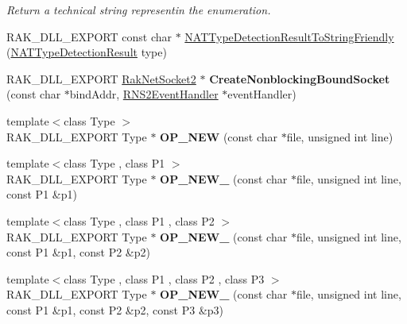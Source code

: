 \begin{DoxyCompactItemize}
\begin{DoxyCompactList}\small\item\em Return a technical string representin the enumeration. \end{DoxyCompactList}\item 
R\-A\-K\-\_\-\-D\-L\-L\-\_\-\-E\-X\-P\-O\-R\-T const char $\ast$ \hyperlink{namespace_rak_net_aa400a447c631b730d879855b65fe2f67}{N\-A\-T\-Type\-Detection\-Result\-To\-String\-Friendly} (\hyperlink{namespace_rak_net_a81848fd95488939c0b3e217209f31139}{N\-A\-T\-Type\-Detection\-Result} type)
\item 
\hypertarget{namespace_rak_net_a726ce73c276121235404b595fb1065c6}{R\-A\-K\-\_\-\-D\-L\-L\-\_\-\-E\-X\-P\-O\-R\-T \hyperlink{class_rak_net_1_1_rak_net_socket2}{Rak\-Net\-Socket2} $\ast$ {\bfseries Create\-Nonblocking\-Bound\-Socket} (const char $\ast$bind\-Addr, \hyperlink{class_rak_net_1_1_r_n_s2_event_handler}{R\-N\-S2\-Event\-Handler} $\ast$event\-Handler)}\label{namespace_rak_net_a726ce73c276121235404b595fb1065c6}

\item 
\hypertarget{namespace_rak_net_a42cc97e251adb58965692886763c1400}{{\footnotesize template$<$class Type $>$ }\\R\-A\-K\-\_\-\-D\-L\-L\-\_\-\-E\-X\-P\-O\-R\-T Type $\ast$ {\bfseries O\-P\-\_\-\-N\-E\-W} (const char $\ast$file, unsigned int line)}\label{namespace_rak_net_a42cc97e251adb58965692886763c1400}

\item 
\hypertarget{namespace_rak_net_a4272a3177741414ca1f0cefb71498bdf}{{\footnotesize template$<$class Type , class P1 $>$ }\\R\-A\-K\-\_\-\-D\-L\-L\-\_\-\-E\-X\-P\-O\-R\-T Type $\ast$ {\bfseries O\-P\-\_\-\-N\-E\-W\-\_} (const char $\ast$file, unsigned int line, const P1 \&p1)}\label{namespace_rak_net_a4272a3177741414ca1f0cefb71498bdf}

\item 
\hypertarget{namespace_rak_net_ab20fdc4d28f0485178e358c62d2ac0f5}{{\footnotesize template$<$class Type , class P1 , class P2 $>$ }\\R\-A\-K\-\_\-\-D\-L\-L\-\_\-\-E\-X\-P\-O\-R\-T Type $\ast$ {\bfseries O\-P\-\_\-\-N\-E\-W\-\_} (const char $\ast$file, unsigned int line, const P1 \&p1, const P2 \&p2)}\label{namespace_rak_net_ab20fdc4d28f0485178e358c62d2ac0f5}

\item 
\hypertarget{namespace_rak_net_aaa0ebd22bb4403c112b2895b5678e6b2}{{\footnotesize template$<$class Type , class P1 , class P2 , class P3 $>$ }\\R\-A\-K\-\_\-\-D\-L\-L\-\_\-\-E\-X\-P\-O\-R\-T Type $\ast$ {\bfseries O\-P\-\_\-\-N\-E\-W\-\_} (const char $\ast$file, unsigned int line, const P1 \&p1, const P2 \&p2, const P3 \&p3)}\label{namespace_rak_net_aaa0ebd22bb4403c112b2895b5678e6b2}


\end{DoxyCompactItemize}
